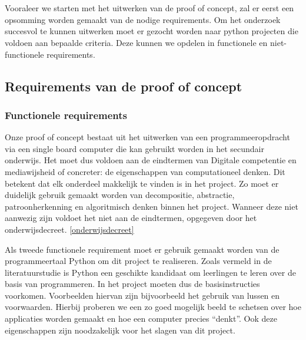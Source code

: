 
\chapter{}
\label{ch:methodologie}


Vooraleer we starten met het uitwerken van de proof of concept, zal er eerst een opsomming worden gemaakt van de nodige requirements. Om het onderzoek succesvol te kunnen uitwerken moet er gezocht worden naar python projecten die voldoen aan bepaalde criteria. 
Deze kunnen we opdelen in functionele en niet-functionele requirements.

\section{Requirements van de proof of concept}

\subsection{Functionele requirements}

Onze proof of concept bestaat uit het uitwerken van een programmeeropdracht via een single board computer die kan gebruikt worden in het secundair onderwijs. Het moet dus voldoen aan de eindtermen van Digitale competentie en mediawijsheid of concreter: de eigenschappen van computationeel denken. Dit betekent dat elk onderdeel makkelijk te vinden is in het project. Zo moet er duidelijk gebruik gemaakt worden van decompositie, abstractie, patroonherkenning en algoritmisch denken binnen het project. Wanneer deze niet aanwezig zijn voldoet het niet aan de eindtermen, opgegeven door het onderwijsdecreet. \ref{onderwijsdecreet}

Als tweede functionele requirement moet er gebruik gemaakt worden van de programmeertaal Python om dit project te realiseren. Zoals vermeld in de literatuurstudie is Python een geschikte kandidaat om leerlingen te leren over de basis van programmeren. In het project moeten dus de basisinstructies voorkomen. Voorbeelden hiervan zijn bijvoorbeeld het gebruik van lussen en voorwaarden. Hierbij proberen we een zo goed mogelijk beeld te schetsen over hoe applicaties worden gemaakt en hoe een computer precies “denkt”. Ook deze eigenschappen zijn noodzakelijk voor het slagen van dit project.


